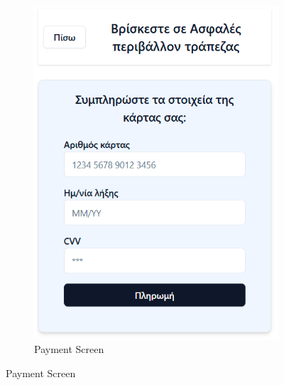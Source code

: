 \documentclass[12pt,a4paper,twoside]{book}
\begin{document}
\begin{figure}[H]
\begin{subfigure}[b]{0.48\textwidth}
        \includegraphics[width=\textwidth]{Resources/Mockup Screens/mockup-payment.png}
        \caption{Payment Screen}\label{fig:mockup6}
    \end{subfigure}
\end{figure}
\end{document}
